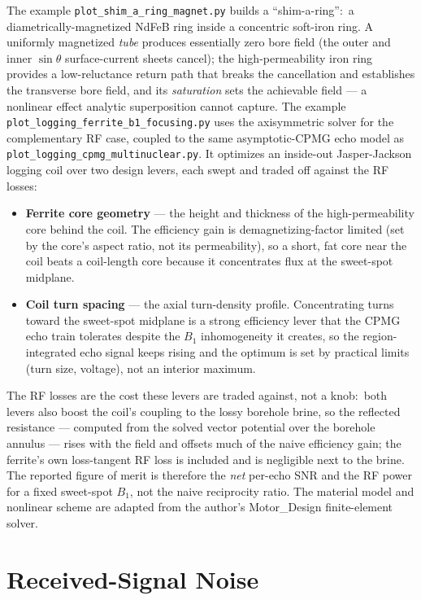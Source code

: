 \documentclass[11pt,oneside]{report}
\newcommand{\code}[1]{\texttt{#1}}
\begin{document}
The example \code{plot\_shim\_a\_ring\_magnet.py} builds a ``shim-a-ring'':\ a
diametrically-magnetized NdFeB ring inside a concentric soft-iron ring. A
uniformly magnetized \emph{tube} produces essentially zero bore field (the outer
and inner \(\sin\theta\) surface-current sheets cancel); the high-permeability
iron ring provides a low-reluctance return path that breaks the cancellation and
establishes the transverse bore field, and its \emph{saturation} sets the
achievable field --- a nonlinear effect analytic superposition cannot capture.
The example \code{plot\_logging\_ferrite\_b1\_focusing.py} uses the axisymmetric
solver for the complementary RF case, coupled to the same asymptotic-CPMG echo
model as \code{plot\_logging\_cpmg\_multinuclear.py}. It optimizes an inside-out
Jasper-Jackson logging coil over two design levers, each swept and traded off
against the RF losses:

\begin{itemize}
  \item \textbf{Ferrite core geometry} --- the height and thickness of the
  high-permeability core behind the coil. The efficiency gain is
  demagnetizing-factor limited (set by the core's aspect ratio, not its
  permeability), so a short, fat core near the coil beats a coil-length core
  because it concentrates flux at the sweet-spot midplane.
  \item \textbf{Coil turn spacing} --- the axial turn-density profile.
  Concentrating turns toward the sweet-spot midplane is a strong efficiency
  lever that the CPMG echo train tolerates despite the \(B_1\) inhomogeneity it
  creates, so the region-integrated echo signal keeps rising and the optimum is
  set by practical limits (turn size, voltage), not an interior maximum.
\end{itemize}

The RF losses are the cost these levers are traded against, not a knob:\ both
levers also boost the coil's coupling to the lossy borehole brine, so the
reflected resistance --- computed from the solved vector potential over the
borehole annulus --- rises with the field and offsets much of the naive
efficiency gain; the ferrite's own loss-tangent RF loss is included and is
negligible next to the brine. The reported figure of merit is therefore the
\emph{net} per-echo SNR and the RF power for a fixed sweet-spot \(B_1\), not the
naive reciprocity ratio. The material model and nonlinear scheme are adapted from
the author's Motor\_Design finite-element solver.

\section{Received-Signal Noise}
\end{document}
